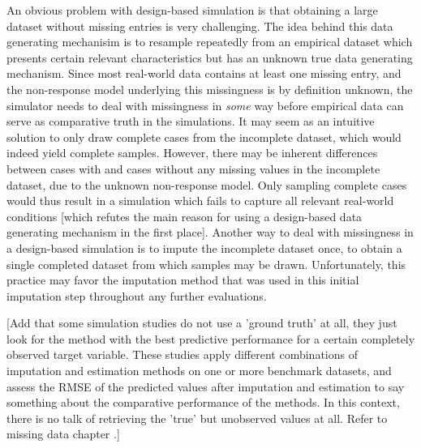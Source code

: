 \documentclass[bimj,fleqn]{w-art}
\theoremstyle{plain}
\theoremstyle{definition}
\begin{document}
An obvious problem with design-based simulation is that obtaining a large dataset without missing entries is very challenging. The idea behind this data generating mechanisim is to resample repeatedly from an empirical dataset which presents certain relevant characteristics but has an unknown true data generating mechanism. Since most real-world data contains at least one missing entry, and the non-response model underlying this missingness is by definition unknown, the simulator needs to deal with missingness in \emph{some} way before empirical data can serve as comparative truth in the simulations. It may seem as an intuitive solution to only draw complete cases from the incomplete dataset, which would indeed yield complete samples. However, there may be inherent differences between cases with and cases without any missing values in the incomplete dataset, due to the unknown non-response model. Only sampling complete cases would thus result in a simulation which fails to capture all relevant real-world conditions [which refutes the main reason for using a design-based data generating mechanism in the first place]. Another way to deal with missingness in a design-based simulation is to impute the incomplete dataset once, to obtain a single completed dataset from which samples may be drawn. Unfortunately, this practice may favor the imputation method that was used in this initial imputation step throughout any further evaluations. 


[Add that some simulation studies do not use a 'ground truth' at all, they just look for the method with the best predictive performance for a certain completely observed target variable. These studies apply different combinations of imputation and estimation methods on one or more benchmark datasets, and assess the RMSE of the predicted values after imputation and estimation to say something about the comparative performance of the methods. In this context, there is no talk of retrieving the 'true' but unobserved values at all. Refer to missing data chapter \citep{liu21}.]
\end{document}

